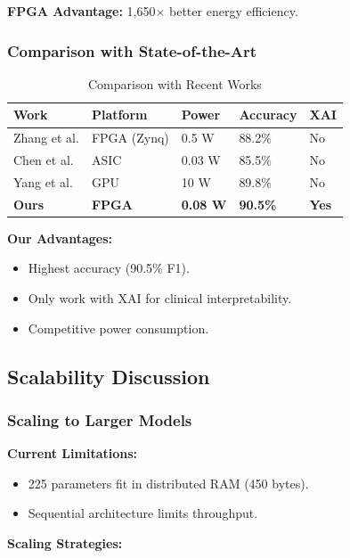 \documentclass[11pt, a4paper]{article}
\begin{document}
\textbf{FPGA Advantage:} 1,650$\times$ better energy efficiency.

\subsubsection{Comparison with State-of-the-Art}

\begin{table}[H]
\centering
\caption{Comparison with Recent Works}
\label{tab:sota_hw}
\begin{tabular}{@{}lllll@{}}
\toprule
\textbf{Work} & \textbf{Platform} & \textbf{Power} & \textbf{Accuracy} & \textbf{XAI} \\ \midrule
Zhang et al. \cite{zhang2021} & FPGA (Zynq) & 0.5 W & 88.2\% & No \\
Chen et al. \cite{chen2020} & ASIC & 0.03 W & 85.5\% & No \\
Yang et al. \cite{yang2019} & GPU & 10 W & 89.8\% & No \\
\textbf{Ours} & \textbf{FPGA} & \textbf{0.08 W} & \textbf{90.5\%} & \textbf{Yes} \\ \bottomrule
\end{tabular}
\end{table}

\textbf{Our Advantages:}
\begin{itemize}
    \item Highest accuracy (90.5\% F1).
    \item Only work with XAI for clinical interpretability.
    \item Competitive power consumption.
\end{itemize}

\subsection{Scalability Discussion}

\subsubsection{Scaling to Larger Models}

\textbf{Current Limitations:}
\begin{itemize}
    \item 225 parameters fit in distributed RAM (450 bytes).
    \item Sequential architecture limits throughput.
\end{itemize}

\textbf{Scaling Strategies:}
\end{document}
